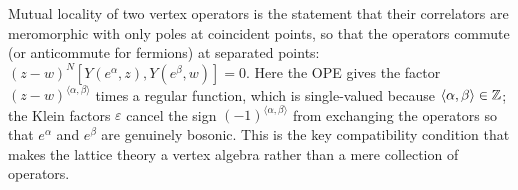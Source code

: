 \begin{physics}
Mutual locality of two vertex operators is the statement that their correlators are meromorphic with only poles at coincident points, so that the operators commute (or anticommute for fermions) at separated points: $(z-w)^N[Y(e^\alpha,z),Y(e^\beta,w)]=0$. Here the OPE gives the factor $(z-w)^{\langle\alpha,\beta\rangle}$ times a regular function, which is single-valued because $\langle\alpha,\beta\rangle\in{\mathbb{Z}}$; the Klein factors $\varepsilon$ cancel the sign $(-1)^{\langle\alpha,\beta\rangle}$ from exchanging the operators so that $e^\alpha$ and $e^\beta$ are genuinely bosonic. This is the key compatibility condition that makes the lattice theory a vertex algebra rather than a mere collection of operators.
\end{physics}

